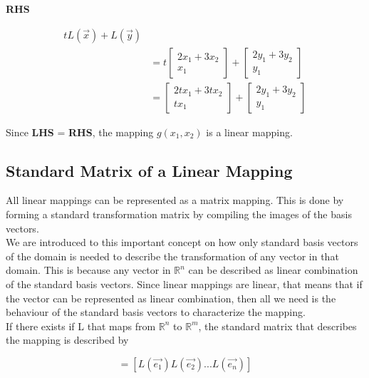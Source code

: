 \documentclass[12pt]{article}
\newcommand{\R}{\mathbb{R}}
\begin{document}
\begin{center}
\textbf{RHS}
\end{center}
\begin{equation}
\begin{split}
tL(\vec{x}) + L(\vec{y})\\
&=t\begin{bmatrix}2x_1 + 3x_2\\x_1\end{bmatrix}+\begin{bmatrix}2y_1+3y_2\\y_1\end{bmatrix}\\
&=\begin{bmatrix}2tx_1 + 3tx_2\\tx_1\end{bmatrix} + \begin{bmatrix}2y_1+3y_2\\y_1\end{bmatrix}
\end{split}
\end{equation}


Since \textbf{LHS} = \textbf{RHS}, the mapping $g(x_1,x_2)$ is a linear mapping.

\subsection{Standard Matrix of a Linear Mapping}
All linear mappings can be represented as a matrix mapping. This is done by forming a standard transformation matrix by compiling the images of the basis vectors.\\
We are introduced to this important concept on how only standard basis vectors of the domain is needed to describe the transformation of any vector in that domain. This is because any vector in $\R^n$ can be described as linear combination of the standard basis vectors. Since linear mappings are linear, that means that if the vector can be represented as linear combination, then all we need is the behaviour of the standard basis vectors to characterize the mapping.\\
If there exists if L that maps from $\R^n$ to $\R^m$,
the standard matrix that describes the mapping is described by 

\begin{equation}
[L] = [L(\vec{e_1}) L(\vec{e_2}) ... L(\vec{e_n})]
\end{equation}
\end{document}
